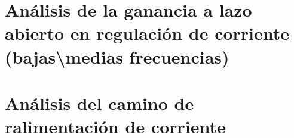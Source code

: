 \section{Análisis de la ganancia a lazo abierto en regulación de corriente (bajas\textbackslash medias frecuencias)}
\resetallcounters

\clearpage

\section{Análisis del camino de ralimentación de corriente}
\resetallcounters

\clearpage


